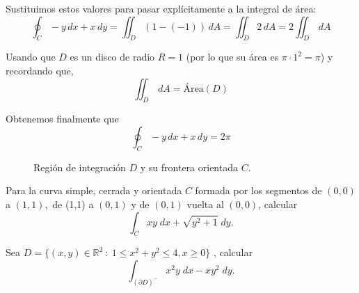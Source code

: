 Sustituimos estos valores para pasar explícitamente a la integral de área:
\[ \oint_C -y \, dx + x \, dy = \iint_D (1 - (-1)) \, dA = \iint_D 2 \, dA =  2  \iint_D  \, dA \]

Usando que $D$ es un disco de radio $R = 1$  (por lo que su área es $\pi \cdot 1^2 = \pi$)  y recordando que,  
\[  \iint_D  \, dA =  \text{Área}(D) \]

Obtenemos finalmente que  
\[ \oint_C -y \, dx + x \, dy = 2\pi \]  

\begin{figure}[h!]
    \centering
    \caption{Región de integración $D$ y su frontera orientada $C$.}
\end{figure}


\begin{tarea}
 Para  la curva simple, cerrada y orientada $C$ formada por los segmentos  de $(0, 0)$ a $(1, 1),$ de (1,1) a $(0, 1)$ y de $(0, 1)$ vuelta al $(0, 0)$, calcular  \[ \int_{C} xy \; dx + \sqrt{y^{2}+1} \; dy.\] 
\end{tarea}


\begin{tarea}
 Sea    $D=\{  (x,y) \in \mathbb{R}^{2} \: : \: 1 \leq x ^{2}+ y^{2}  \leq  4,  x\geq 0 \}$ , calcular    \[ \int_{(\partial D)^{-}} x^{2}y \; dx - xy^{2} \; dy.\] 
\end{tarea}
